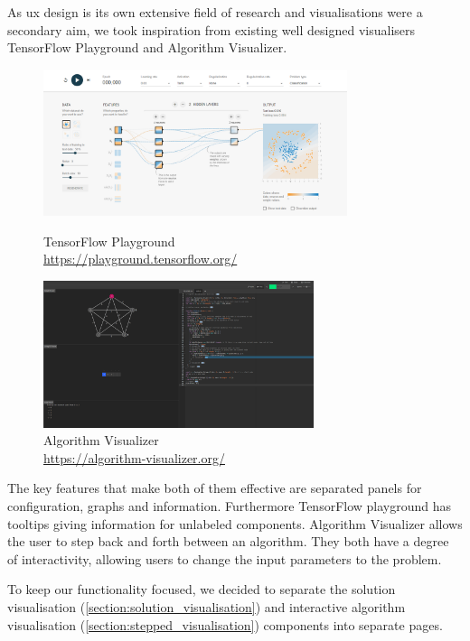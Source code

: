 As \acrshort{ux} design is its own extensive field of research and visualisations were a secondary aim, we took inspiration from existing well designed visualisers TensorFlow Playground and Algorithm Visualizer.

\begin{figure}[H]
    \begin{minipage}{0.54\textwidth}
        \includegraphics[height=4.3cm]{images/tensor-flow-playground.png}
        \caption{TensorFlow Playground\\\url{https://playground.tensorflow.org/}}
        \label{fig:tensorflow_playground}
    \end{minipage}
    \begin{minipage}{0.46\textwidth}
        \includegraphics[height=4.3cm]{images/algorithm-visualizer.png}
        \caption{Algorithm Visualizer\\\url{
https://algorithm-visualizer.org/}}
        \label{fig:algorithm_visualizer}
    \end{minipage}
\end{figure}

The key features that make both of them effective are separated panels for configuration, graphs and information. Furthermore TensorFlow playground has tooltips giving information for unlabeled components. Algorithm Visualizer allows the user to step back and forth between an algorithm. They both have a degree of interactivity, allowing users to change the input parameters to the problem.

To keep our functionality focused, we decided to separate the solution visualisation (\cref{section:solution_visualisation}) and interactive algorithm visualisation (\cref{section:stepped_visualisation}) components into separate pages.